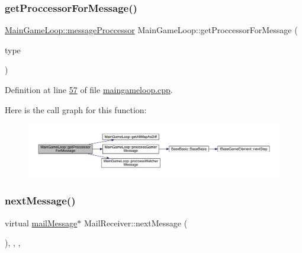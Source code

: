 \subsubsection{\texorpdfstring{get\+Proccessor\+For\+Message()}{getProccessorForMessage()}}
{\footnotesize\ttfamily \hyperlink{a00209_a3aecf6efe74a0fe8b40e2d28bf4032ba}{Main\+Game\+Loop\+::message\+Proccessor} Main\+Game\+Loop\+::get\+Proccessor\+For\+Message (\begin{DoxyParamCaption}\item[{\hyperlink{a00008_ab66d8802c50493de7d50e181d6f8e296}{e\+Connection\+Type}}]{type }\end{DoxyParamCaption})\hspace{0.3cm}{\ttfamily [private]}}



Definition at line \hyperlink{a00089_source_l00057}{57} of file \hyperlink{a00089_source}{maingameloop.\+cpp}.

Here is the call graph for this function\+:
\nopagebreak
\begin{figure}[H]
\begin{center}
\leavevmode
\includegraphics[width=350pt]{d3/de5/a00209_ab9de0ceedab969b5f7fd9e1131bc4cd5_cgraph}
\end{center}
\end{figure}
\mbox{\label{a00197_a127a70ec582190f90979cb72b8cba72c}} 
\subsubsection{\texorpdfstring{next\+Message()}{nextMessage()}}
{\footnotesize\ttfamily virtual \hyperlink{a00201}{mail\+Message}$\ast$ Mail\+Receiver\+::next\+Message (\begin{DoxyParamCaption}{ }\end{DoxyParamCaption})\hspace{0.3cm}{\ttfamily [inline]}, {\ttfamily [protected]}, {\ttfamily [virtual]}, {\ttfamily [inherited]}}



